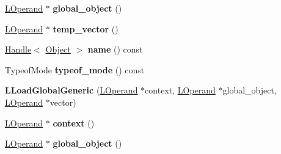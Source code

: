 \begin{DoxyCompactItemize}
\item 
\hyperlink{classv8_1_1internal_1_1_l_operand}{L\+Operand} $\ast$ {\bfseries global\+\_\+object} ()\hypertarget{classv8_1_1internal_1_1_l_load_global_generic_a43bc76ffc93765b0231ba74a702acb19}{}\label{classv8_1_1internal_1_1_l_load_global_generic_a43bc76ffc93765b0231ba74a702acb19}

\item 
\hyperlink{classv8_1_1internal_1_1_l_operand}{L\+Operand} $\ast$ {\bfseries temp\+\_\+vector} ()\hypertarget{classv8_1_1internal_1_1_l_load_global_generic_a6e6428d159408fa7d9a31d38cc08919c}{}\label{classv8_1_1internal_1_1_l_load_global_generic_a6e6428d159408fa7d9a31d38cc08919c}

\item 
\hyperlink{classv8_1_1internal_1_1_handle}{Handle}$<$ \hyperlink{classv8_1_1internal_1_1_object}{Object} $>$ {\bfseries name} () const \hypertarget{classv8_1_1internal_1_1_l_load_global_generic_a8986cdf04702fb63aee12526199431ab}{}\label{classv8_1_1internal_1_1_l_load_global_generic_a8986cdf04702fb63aee12526199431ab}

\item 
Typeof\+Mode {\bfseries typeof\+\_\+mode} () const \hypertarget{classv8_1_1internal_1_1_l_load_global_generic_a92314902b26af0eba30f17b3c9e9d768}{}\label{classv8_1_1internal_1_1_l_load_global_generic_a92314902b26af0eba30f17b3c9e9d768}

\item 
{\bfseries L\+Load\+Global\+Generic} (\hyperlink{classv8_1_1internal_1_1_l_operand}{L\+Operand} $\ast$context, \hyperlink{classv8_1_1internal_1_1_l_operand}{L\+Operand} $\ast$global\+\_\+object, \hyperlink{classv8_1_1internal_1_1_l_operand}{L\+Operand} $\ast$vector)\hypertarget{classv8_1_1internal_1_1_l_load_global_generic_a5992cad6cdc59da767d3d35fdbf4c4f7}{}\label{classv8_1_1internal_1_1_l_load_global_generic_a5992cad6cdc59da767d3d35fdbf4c4f7}

\item 
\hyperlink{classv8_1_1internal_1_1_l_operand}{L\+Operand} $\ast$ {\bfseries context} ()\hypertarget{classv8_1_1internal_1_1_l_load_global_generic_acb9446dcc83f4319988b01ff0d957bf6}{}\label{classv8_1_1internal_1_1_l_load_global_generic_acb9446dcc83f4319988b01ff0d957bf6}

\item 
\hyperlink{classv8_1_1internal_1_1_l_operand}{L\+Operand} $\ast$ {\bfseries global\+\_\+object} ()\hypertarget{classv8_1_1internal_1_1_l_load_global_generic_a43bc76ffc93765b0231ba74a702acb19}{}\label{classv8_1_1internal_1_1_l_load_global_generic_a43bc76ffc93765b0231ba74a702acb19}


\end{DoxyCompactItemize}
